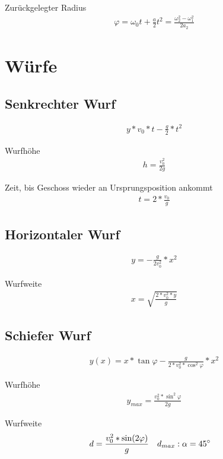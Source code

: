 \documentclass[17pt]{extarticle}
\begin{document}
	Zurückgelegter Radius
	\begin{align}
		\varphi = \omega_{0}t + \frac{a}{2}t^2 = \frac{\omega_{2}^2 - \omega_{1}^2}{2a_{2}}
	\end{align}
	
	\section{Würfe}

	\subsection{Senkrechter Wurf}
	\begin{align}
		y * v_{0} * t - \frac{g}{2} * t^{2}
	\end{align}
	
	Wurfhöhe
	\begin{align}
		h = \frac{v_{0}^{2}}{2g}
	\end{align}
	
	Zeit, bis Geschoss wieder an Ursprungsposition ankommt
	\begin{align}
		t = 2 * \frac{v_{0}}{g} 
	\end{align}
	\subsection{Horizontaler Wurf}
	\begin{align}
		y = - \frac{g}{2v_{0}^{2}} * x^{2}
	\end{align}
	
	Wurfweite
	\begin{align}
		x = \sqrt{\frac{2 * v_0^2 * y}{g}}
	\end{align}
	
	\subsection{Schiefer Wurf}
	\begin{align}
		y(x) = x * \tan \varphi - \frac{g}{2 * v_{0}^{2} * \cos^{2} \varphi} * x^{2}
	\end{align}
	
	Wurfhöhe
	\begin{align}
		y_{max} = \frac{v_{0}^{2} * \sin^{2} \varphi}{2g}
	\end{align}
	
	Wurfweite
	\begin{align}
		&d = \frac{v_{0}^{2} * \sin(2\varphi)}{g}
		&&d_{max}: \alpha = 45\degree
	\end{align}
\end{document}
